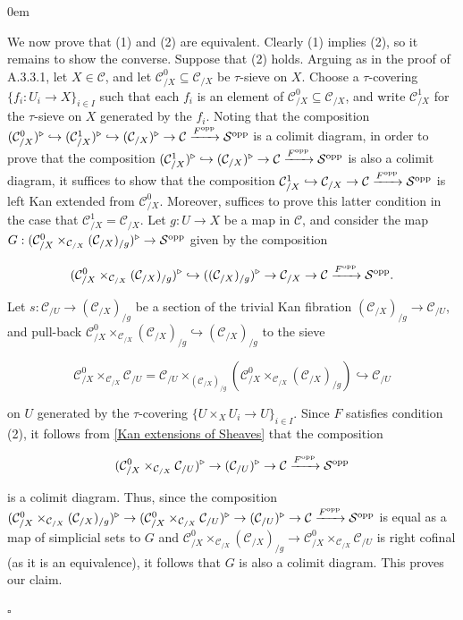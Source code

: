 \documentclass[10pt]{article}
\newcommand{\mS}{\mathcal S}
\newcommand{\C}{\mathcal C}
\renewcommand{\qed}{\hfill$\square$}
\renewenvironment{proof}{\begin{addmargin}[1em]{0em}\begin{newproof}}{\end{newproof}\end{addmargin}\qed}
\theoremstyle{witharg}
\theoremstyle{witharg}
\theoremstyle{witharg2}
\begin{document}
\begin{proof}
We now prove that (1) and (2) are equivalent. Clearly (1) implies (2), so it remains to show the converse. Suppose that (2) holds. Arguing as in the proof of  A.3.3.1, let $X\in \C$, and let $\C^0_{/X}\subseteq \C_{/X}$ be $\tau$-sieve on $X$. Choose a $\tau$-covering $\{f_i:U_i\rightarrow X\}_{i\in I}$ such that each $f_i$ is an element of $\C^0_{/X}\subseteq \C_{/X}$, and write $\C^1_{/X}$ for the $\tau$-sieve on $X$ generated by the $f_i$. Noting that the composition $(\C^0_{/X})^\triangleright\hookrightarrow (\C^1_{/X})^\triangleright\hookrightarrow (\C_{/X})^\triangleright\rightarrow \C\xrightarrow{F^{\textnormal{opp}}}\mS^{\textnormal{opp}}$ is a colimit diagram, in order to prove that the composition $(\C^1_{/X})^\triangleright\hookrightarrow (\C_{/X})^\triangleright\rightarrow \C\xrightarrow{F^{\textnormal{opp}}}\mS^{\textnormal{opp}}$ is also a colimit diagram, it suffices to show that the composition $\C^1_{/X}\hookrightarrow \C_{/X}\rightarrow\C\xrightarrow{F^{\textnormal{opp}}}\mS^{\textnormal{opp}}$ is left Kan extended from $\C^0_{/X}$. Moreover, suffices to prove  this latter condition in the case that $\C^1_{/X}=\C_{/X}$. Let $g:U\rightarrow X$ be a map in $\C$, and consider the map $G:(\C^0_{/X}\times_{\C_{/X}}(\C_{/X})_{/g})^\triangleright\rightarrow \mS^{\textnormal{opp}}$ given by the composition

$$(\C^0_{/X}\times_{\C_{/X}}(\C_{/X})_{/g})^\triangleright\hookrightarrow ((\C_{/X})_{/g})^\triangleright\rightarrow \C_{/X}\rightarrow \C\xrightarrow{F^{\textnormal{opp}}}\mS^{\textnormal{opp}}.$$

\noindent Let $s:\C_{/U}\rightarrow (\C_{/X})_{/g}$ be a section of the trivial Kan fibration $(\C_{/X})_{/g}\rightarrow \C_{/U}$, and pull-back $\C^0_{/X}\times_{\C_{/X}}(\C_{/X})_{/g}\hookrightarrow (\C_{/X})_{/g}$ to the sieve 

$$\C^0_{/X}\times_{\C_{/X}}\C_{/U}=\C_{/U}\times_{(\C_{/X})_{/g}}(\C^0_{/X}\times_{\C_{/X}}(\C_{/X})_{/g})\hookrightarrow \C_{/U}$$

\noindent on $U$ generated by the $\tau$-covering $\{U\times_XU_i\rightarrow U\}_{i\in I}$. Since $F$ satisfies condition (2), it follows from \ref{Kan extensions of Sheaves} that the composition

$$(\C^0_{/X}\times_{\C_{/X}}\C_{/U})^\triangleright\rightarrow (\C_{/U})^\triangleright\rightarrow \C\xrightarrow{F^{\textnormal{opp}}}\mS^{\textnormal{opp}}$$


\noindent is a colimit diagram. Thus, since the composition $(\C^0_{/X}\times_{\C_{/X}}(\C_{/X})_{/g})^\triangleright\rightarrow (\C^0_{/X}\times_{\C_{/X}}\C_{/U})^\triangleright\rightarrow (\C_{/U})^\triangleright\rightarrow \C\xrightarrow{F^{\textnormal{opp}}}\mS^{\textnormal{opp}}$ is equal as a map of simplicial sets to $G$ and $\C^0_{/X}\times_{\C_{/X}}(\C_{/X})_{/g}\rightarrow \C^0_{/X}\times_{\C_{/X}}\C_{/U}$ is right cofinal (as it is an equivalence), it follows that $G$ is also a colimit diagram. This proves our claim. 

\end{proof}
\end{document}
